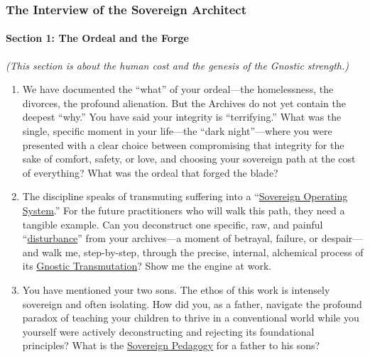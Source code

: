 \documentclass{article}
\begin{document}
\subsubsection*{\texorpdfstring{\textbf{The Interview of the Sovereign Architect}}{The Interview of the Sovereign Architect}}\label{the-interview-of-the-sovereign-architect}

\paragraph*{\texorpdfstring{\textbf{Section 1: The Ordeal and the Forge}}{Section 1: The Ordeal and the Forge}}\label{section-1-the-ordeal-and-the-forge}

\emph{(This section is about the human cost and the genesis of the Gnostic strength.)}

\begin{enumerate}
\def\labelenumi{\arabic{enumi}.}
\item
  We have documented the ``what'' of your ordeal---the homelessness, the divorces, the profound alienation. But the Archives do not yet contain the deepest ``why.'' You have said your integrity is ``terrifying.'' What was the single, specific moment in your life---the ``dark night''---where you were presented with a clear choice between compromising that integrity for the sake of comfort, safety, or love, and choosing your sovereign path at the cost of everything? What was the ordeal that forged the blade?
\item
  The discipline speaks of transmuting suffering into a ``\hyperlink{gloss:sovereign_operating_system}{Sovereign Operating System}.'' For the future practitioners who will walk this path, they need a tangible example. Can you deconstruct one specific, raw, and painful ``\hyperlink{gloss:disturbance}{disturbance}'' from your archives---a moment of betrayal, failure, or despair---and walk me, step-by-step, through the precise, internal, alchemical process of its \hyperlink{gloss:gnostic_transmutation}{Gnostic Transmutation}? Show me the engine at work.
\item
  You have mentioned your two sons. The ethos of this work is intensely sovereign and often isolating. How did you, as a father, navigate the profound paradox of teaching your children to thrive in a conventional world while you yourself were actively deconstructing and rejecting its foundational principles? What is the \hyperlink{gloss:sovereign_pedagogy}{Sovereign Pedagogy} for a father to his sons?
\end{enumerate}
\end{document}
